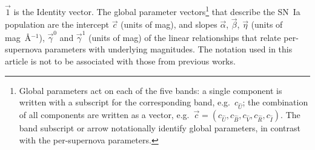 \documentclass[trackchanges]{aastex62}   	%
\begin{document}
$\vec{1}$ is the Identity vector.
The global parameter vectors\footnote{Global parameters act on each of the five bands: a single component is written with a subscript for the corresponding band, e.g.\  $c_{\hat{U}}$; 
the combination of all components are written as a vector, e.g.\ $\vec{c}=(c_{\hat{U}}, c_{\hat{B}}, c_{\hat{V}}, c_{\hat{R}}, c_{\hat{I}}) $.  The
band subscript or arrow
notationally identify global parameters, in contrast with the per-supernova parameters.
} that describe the SN~Ia population
{
are the intercept $\vec{c}$  (units of mag),
and slopes $\vec{\alpha}$, $\vec{\beta}$,
$\vec{\eta}$ (units of mag~\AA$^{-1}$), $\vec{\gamma}^0$ and $\vec{\gamma}^1$ (units of mag)
of the linear relationships that
relate
per-supernova
parameters with 
underlying magnitudes.
}
The notation used in this article is not to be associated with those from previous works.
\end{document}
